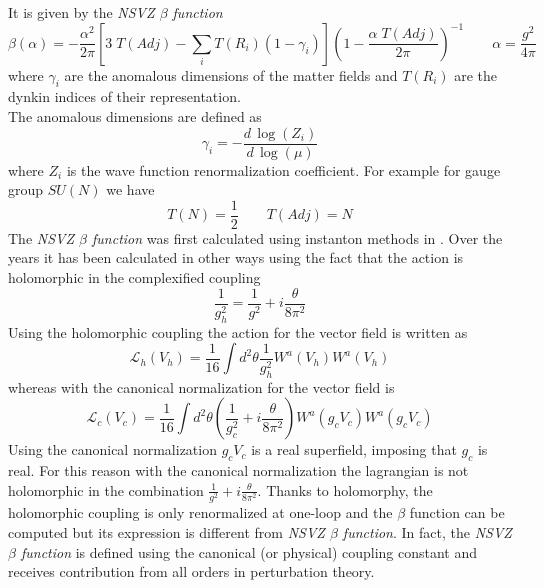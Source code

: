 It is given by the \emph{NSVZ $\beta$ function} 
\begin{equation}
  \beta (\alpha) = - \frac{\alpha^2}{2 \pi} \left[ 3 \; T(Adj) - \sum_i T( R_i) ( 1 - \gamma_i ) \right]  \left( 1 - \frac{ \alpha \; T(Adj)  }{2 \pi} \right)^{-1} \qquad \alpha = \frac{g^2}{4 \pi}
\label{beta-exact}
\end{equation} 
where $\gamma_i$ are the anomalous dimensions of the matter fields and $T(R_i)$ are the dynkin indices of their representation.\\
The anomalous dimensions are defined as
\begin{equation}
 \gamma_i = - \frac{d \, \log(Z_i) }{d \, \log( \mu)}
\end{equation}
where $Z_i$ is the wave function renormalization coefficient.
For example for gauge group $SU(N)$ we have
\begin{equation*}
 T(N) = \frac{1}{2} \qquad T(Adj) = N 
\end{equation*}
The \emph{NSVZ $\beta$ function} was first calculated using instanton methods in \cite{Novikov:1985rd}. 
Over the years it has been calculated in other ways using the fact that the action is holomorphic in the complexified coupling
\begin{equation}
	\frac{1}{g_h^2} = \frac{1}{g^2 } + i \frac{\theta}{8 \pi^2} 
\end{equation}
Using the holomorphic coupling the action for the vector field is written as
\begin{equation}
 \mathcal{L}_h ( V_h) = \frac{1}{16} \int d^2 \theta \frac{1}{g_h^2} W^a ( V_h) W^a(V_h) 
\end{equation}
whereas with the canonical normalization for the vector field is
\begin{equation}
 \mathcal{L}_c ( V_c) = \frac{1}{16} \int d^2 \theta \left( \frac{1}{g_c^2}  +i \frac{\theta}{8 \pi^2} \right) W^a ( g_c V_c) W^a(g_c V_c) 
\end{equation}
Using the canonical normalization $g_c V_c$ is a real superfield, imposing that $g_c$ is real. For this reason with the canonical normalization the lagrangian is not holomorphic in the combination $ \frac{1}{g^2 } + i \frac{\theta}{8 \pi^2} $.
Thanks to holomorphy, the holomorphic coupling is only renormalized at one-loop and the $\beta$ function can be computed but its expression is different from \emph{NSVZ $\beta$ function}.
In fact, the \emph{NSVZ $\beta$ function} is defined using the canonical (or physical) coupling constant and receives contribution from all orders in perturbation theory.

